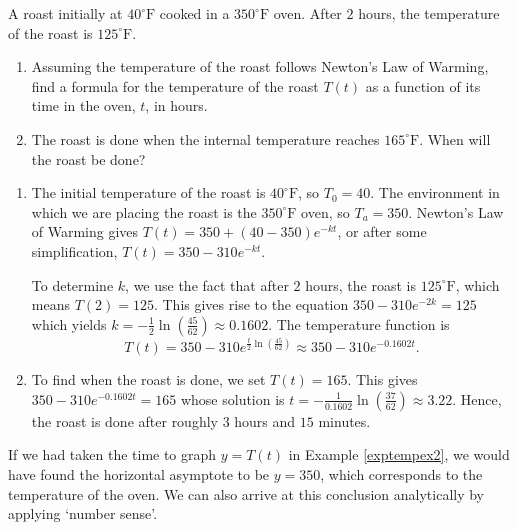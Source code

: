 \documentclass{ximera}
\begin{document}
\begin{example} \label{exptempex2} A roast initially at  $40^{\circ}\text{F}$ cooked in a $350^{\circ}\text{F}$ oven.  After $2$ hours, the temperature of the roast is $125^{\circ}\text{F}$.

\begin{enumerate}

\item  Assuming the temperature of the roast follows Newton's Law of Warming, find a formula for the temperature of the roast $T(t)$ as a function of its time in the oven, $t$, in hours.

\item  The roast is done when the internal temperature reaches $165^{\circ}\text{F}$.  When will the roast be done?

\end{enumerate}

\begin{explanation}

\begin{enumerate}

\item  The initial temperature of the roast is $40^{\circ}\text{F}$, so $T_0 = 40$.  The environment in which we are placing the roast is the $350^{\circ}\text{F}$ oven, so $T_{a} = 350$. Newton's Law of Warming gives $T(t) = 350 + (40-350)e^{-kt}$, or after some simplification,  $T(t) = 350 - 310e^{-kt}$.  

 

To determine $k$, we use the fact that after $2$ hours, the roast is  $125^{\circ}\text{F}$, which means $T(2) = 125$.  This gives rise to the equation $350 - 310e^{-2k} = 125$ which yields $k = -\frac{1}{2} \ln \left( \frac{45}{62}  \right) \approx 0.1602$.  The temperature function is \[T(t) = 350 - 310 e^{\frac{t}{2} \ln \left( \frac{45}{62}  \right)} \approx 350- 310 e^{-0.1602 t}.\]


\item  To find when the roast is done, we set $T(t) = 165$.  This gives $350- 310 e^{-0.1602 t} = 165$ whose solution is $t = -\frac{1}{0.1602} \ln \left( \frac{37}{62}  \right) \approx 3.22$.  Hence, the roast is done after roughly $3$ hours and $15$ minutes. 

\end{enumerate}
\end{explanation}
\end{example}

If we had taken the time to graph $y=T(t)$ in Example \ref{exptempex2}, we would have found the horizontal asymptote to be $y = 350$, which corresponds to the temperature of the oven. We can also arrive at this conclusion analytically by applying  `number sense'.  
\end{document}
